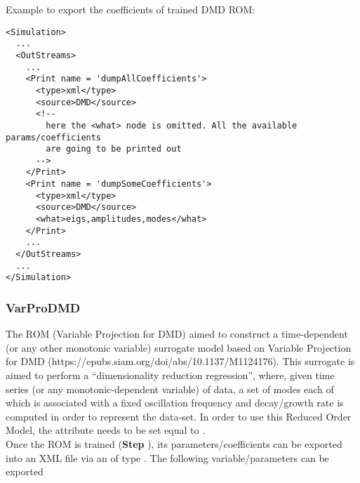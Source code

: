 Example to export the coefficients of trained DMD ROM:
\begin{lstlisting}[style=XML,morekeywords={name,subType}]
<Simulation>
  ...
  <OutStreams>
    ...
    <Print name = 'dumpAllCoefficients'>
      <type>xml</type>
      <source>DMD</source>
      <!--
        here the <what> node is omitted. All the available params/coefficients
        are going to be printed out
      -->
    </Print>
    <Print name = 'dumpSomeCoefficients'>
      <type>xml</type>
      <source>DMD</source>
      <what>eigs,amplitudes,modes</what>
    </Print>
    ...
  </OutStreams>
  ...
</Simulation>
\end{lstlisting}


\subsubsection{VarProDMD}
  The  ROM (Variable Projection for DMD) aimed to construct a time-dependent
  (or any other monotonic     variable) surrogate model based on Variable Projection for DMD
  (https://epubs.siam.org/doi/abs/10.1137/M1124176).     This surrogate is aimed to perform a
  ``dimensionality reduction regression'', where, given time     series (or any monotonic-dependent
  variable) of data, a set of modes each of which is associated     with a fixed oscillation
  frequency and decay/growth rate is computed     in order to represent the data-set.     In order
  to use this Reduced Order Model, the  attribute      needs to be set
  equal to .     \\     Once the ROM  is trained (\textbf{Step}
  ), its parameters/coefficients can be exported into an XML file     via an
   of type . The following variable/parameters  can be exported
